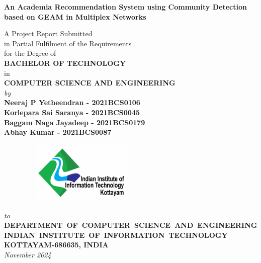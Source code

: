 \documentclass[12pt,a4wide]{report}
\theoremstyle{plain}
\theoremstyle{definition}
\theoremstyle{remark}
\begin{document}

\begin{titlepage}
\enlargethispage{5cm}

\begin{center}

\vspace*{-1cm}

\textbf{\Large An Academia Recommendation System using Community Detection based on GEAM in Multiplex Networks}\\[10pt]

\vspace*{2 cm}


                         A Project Report Submitted \\
                     in Partial Fulfilment of the Requirements  \\
                     for the Degree of  \\
                          \vspace{4.5mm}
                   {\Large \bf BACHELOR OF TECHNOLOGY } \\
                   in \\
                   {\large \bf COMPUTER SCIENCE AND ENGINEERING } \\

                      \vspace{9mm}
                   {\em  by} \\ \vspace{2.5mm}
             {\large \bf Neeraj P Yetheendran - 2021BCS0106 } \\
             {\large \bf Korlepara Sai Saranya - 2021BCS0045 } \\
             {\large \bf Baggam Naga Jayadeep - 2021BCS0179 } \\
             {\large \bf Abhay Kumar - 2021BCS0087 } \\


\vfill

\begin{figure}[h]
  \begin{center}
  \includegraphics[width=6cm, height=3cm]{logo2.jpg}
  \end{center}
\end{figure}
\vspace*{0.2cm}
{\em\large to }\\%
{\bf \mbox{DEPARTMENT OF COMPUTER SCIENCE AND ENGINEERING}} \\%
{\bf \mbox{INDIAN INSTITUTE OF INFORMATION TECHNOLOGY}}\\%
{\bf KOTTAYAM-686635, INDIA}\\%
{\it November 2024}


\end{center}
\end{titlepage}
\end{document}
